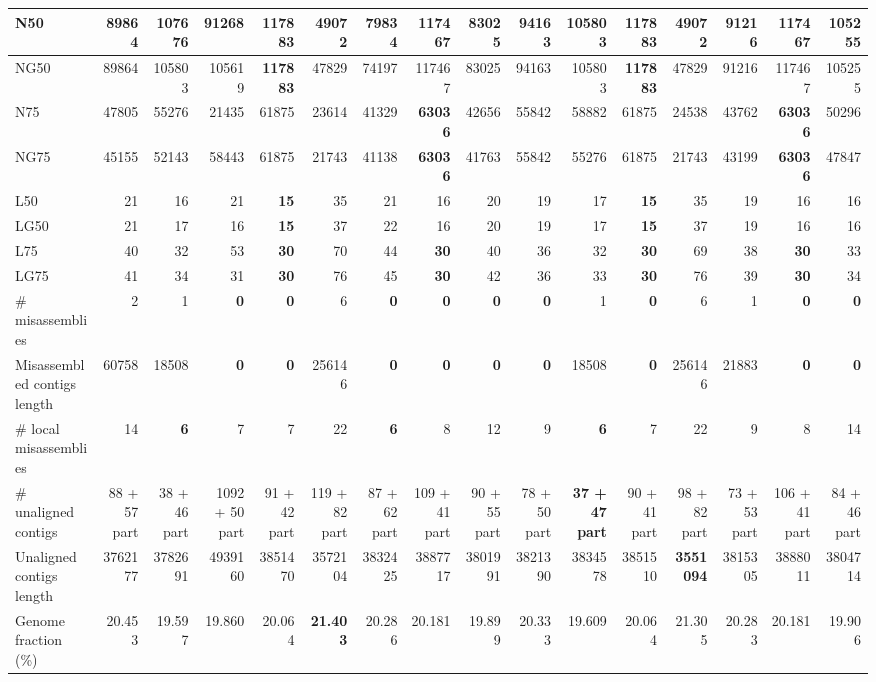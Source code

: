 \documentclass[12pt,a4paper]{article}
\begin{document}
\begin{table}[ht]
\begin{center}
\begin{tabular}{|l*{15}{|r}|}
N50 & 89864 & 107676 & 91268 & {\bf 117883} & 49072 & 79834 & 117467 & 83025 & 94163 & 105803 & {\bf 117883} & 49072 & 91216 & 117467 & 105255 \\ \hline
NG50 & 89864 & 105803 & 105619 & {\bf 117883} & 47829 & 74197 & 117467 & 83025 & 94163 & 105803 & {\bf 117883} & 47829 & 91216 & 117467 & 105255 \\ \hline
N75 & 47805 & 55276 & 21435 & 61875 & 23614 & 41329 & {\bf 63036} & 42656 & 55842 & 58882 & 61875 & 24538 & 43762 & {\bf 63036} & 50296 \\ \hline
NG75 & 45155 & 52143 & 58443 & 61875 & 21743 & 41138 & {\bf 63036} & 41763 & 55842 & 55276 & 61875 & 21743 & 43199 & {\bf 63036} & 47847 \\ \hline
L50 & 21 & 16 & 21 & {\bf 15} & 35 & 21 & 16 & 20 & 19 & 17 & {\bf 15} & 35 & 19 & 16 & 16 \\ \hline
LG50 & 21 & 17 & 16 & {\bf 15} & 37 & 22 & 16 & 20 & 19 & 17 & {\bf 15} & 37 & 19 & 16 & 16 \\ \hline
L75 & 40 & 32 & 53 & {\bf 30} & 70 & 44 & {\bf 30} & 40 & 36 & 32 & {\bf 30} & 69 & 38 & {\bf 30} & 33 \\ \hline
LG75 & 41 & 34 & 31 & {\bf 30} & 76 & 45 & {\bf 30} & 42 & 36 & 33 & {\bf 30} & 76 & 39 & {\bf 30} & 34 \\ \hline
\# misassemblies & 2 & 1 & {\bf 0} & {\bf 0} & 6 & {\bf 0} & {\bf 0} & {\bf 0} & {\bf 0} & 1 & {\bf 0} & 6 & 1 & {\bf 0} & {\bf 0} \\ \hline
Misassembled contigs length & 60758 & 18508 & {\bf 0} & {\bf 0} & 256146 & {\bf 0} & {\bf 0} & {\bf 0} & {\bf 0} & 18508 & {\bf 0} & 256146 & 21883 & {\bf 0} & {\bf 0} \\ \hline
\# local misassemblies & 14 & {\bf 6} & 7 & 7 & 22 & {\bf 6} & 8 & 12 & 9 & {\bf 6} & 7 & 22 & 9 & 8 & 14 \\ \hline
\# unaligned contigs & 88 + 57 part & 38 + 46 part & 1092 + 50 part & 91 + 42 part & 119 + 82 part & 87 + 62 part & 109 + 41 part & 90 + 55 part & 78 + 50 part & {\bf 37 + 47 part} & 90 + 41 part & 98 + 82 part & 73 + 53 part & 106 + 41 part & 84 + 46 part \\ \hline
Unaligned contigs length & 3762177 & 3782691 & 4939160 & 3851470 & 3572104 & 3832425 & 3887717 & 3801991 & 3821390 & 3834578 & 3851510 & {\bf 3551094} & 3815305 & 3888011 & 3804714 \\ \hline
Genome fraction (\%) & 20.453 & 19.597 & 19.860 & 20.064 & {\bf 21.403} & 20.286 & 20.181 & 19.899 & 20.333 & 19.609 & 20.064 & 21.305 & 20.283 & 20.181 & 19.906 \\ \hline

\end{tabular}
\end{center}
\end{table}
\end{document}
